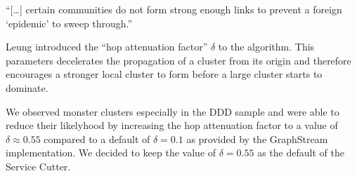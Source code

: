 \enquote{[\dots] certain communities do not form strong enough links to
prevent a foreign \enquote{epidemic} to sweep through.}\cite[p. 5]{leung}

Leung introduced the \enquote{hop attenuation factor} $\delta$ to the algorithm. This parameters decelerates the propagation of a cluster from its origin and therefore encourages a stronger local cluster to form before a large cluster starts to dominate.

We observed monster clusters especially in the DDD sample and were able to reduce their likelyhood by increasing the hop attenuation factor to a value of $\delta \approx 0.55$ compared to a default of $ \delta = 0.1$ as provided by the GraphStream implementation. We decided to keep the value of $\delta = 0.55$ as the default of the Service Cutter.
